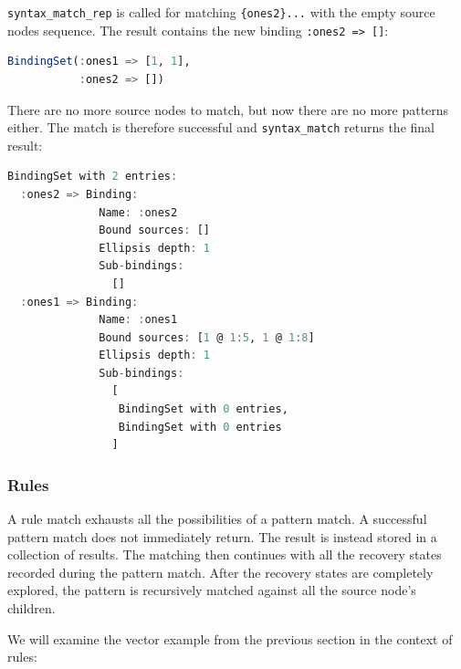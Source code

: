 \documentclass{juliacon}
\begin{document}
\texttt{syntax\_match\_rep} is called for matching \texttt{\{ones2\}...} with the empty
source nodes sequence. The result contains the new binding \texttt{:ones2 =>
[]}:

\begin{lstlisting}[language=julia]
BindingSet(:ones1 => [1, 1],
           :ones2 => [])
\end{lstlisting}

There are no more source nodes to match, but now there are no more
patterns either. The match is therefore successful and \texttt{syntax\_match}
returns the final result:

\begin{lstlisting}[language=julia]
BindingSet with 2 entries:
  :ones2 => Binding:
              Name: :ones2
              Bound sources: []
              Ellipsis depth: 1
              Sub-bindings:
                []
  :ones1 => Binding:
              Name: :ones1
              Bound sources: [1 @ 1:5, 1 @ 1:8]
              Ellipsis depth: 1
              Sub-bindings:
                [
                 BindingSet with 0 entries,
                 BindingSet with 0 entries
                ]
\end{lstlisting}

\subsubsection{Rules}
\label{sec:org9395359}

A rule match exhausts all the possibilities of a pattern match. A
successful pattern match does not immediately return. The result is
instead stored in a collection of results. The matching then continues
with all the recovery states recorded during the pattern match. After
the recovery states are completely explored, the pattern is
recursively matched against all the source node's children.

We will examine the vector example from the previous section in the
context of rules:
\end{document}
